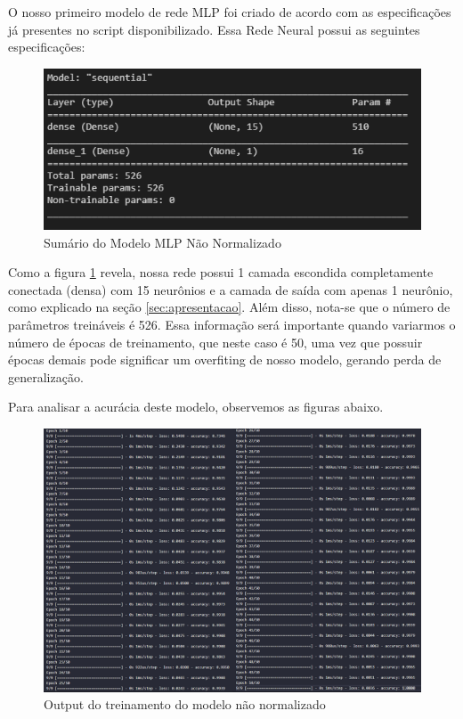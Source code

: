 \documentclass[12pt]{article}
\begin{document}
O nosso primeiro modelo de rede MLP foi criado de acordo com as especificações já presentes no script disponibilizado. Essa Rede Neural possui as seguintes especificações:

\begin{figure}[H]
	\centering
	\includegraphics[width=0.7\linewidth]{Imagens/SumarioModeloNaoNormalziado}
	\caption{Sumário do Modelo MLP Não Normalizado}
	\label{fig:sumariomodelonaonormalziado}
\end{figure}

Como a figura \ref{fig:sumariomodelonaonormalziado} revela, nossa rede possui 1 camada escondida completamente conectada (densa) com 15 neurônios e a camada de saída com apenas 1 neurônio, como explicado na seção \ref{sec:apresentacao}. Além disso, nota-se que o número de parâmetros treináveis é 526. Essa informação será importante quando variarmos o número de épocas de treinamento, que neste caso é 50, uma vez que possuir épocas demais pode significar um overfiting de nosso modelo, gerando perda de generalização. 

Para analisar a acurácia deste modelo, observemos as figuras abaixo.

\begin{figure}[H]
	\centering
	\includegraphics[width=1.1\linewidth]{Imagens/Fit_NaoNormalizado}
	\caption{Output do treinamento do modelo não normalizado}
	\label{fig:fitnaonormalizado}
\end{figure}
\end{document}
